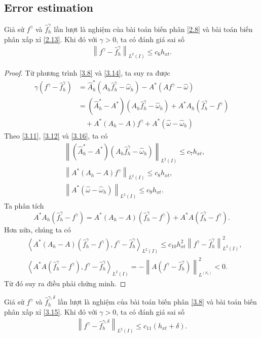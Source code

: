 \documentclass[]{article}
\begin{document}
\subsection{Error estimation}
\begin{dl}\label{dl3.3}
	Giả sử $f^\gamma$ và $\hat{f}^\gamma_h$ lần lượt là nghiệm của bài toán biến phân \eqref{2.8} và bài toán biến phân xấp xỉ \eqref{2.13}. Khi đó với $\gamma>0$, ta có đánh giá sai số
	\begin{align}\label{3.17}
	\left\|f^\gamma-\hat{f}^\gamma_h \right\|_{L^2(I)}\leq c_6h_{xt}.
	\end{align}
\end{dl}
\begin{proof} Từ phương trình \eqref{3.8} và \eqref{3.14}, ta suy ra được
	\begin{align*}
		\gamma \left(f^\gamma-\hat{f}^\gamma_h\right)&=\hat{A}^*_h\left(A_h\hat{f}^\gamma_h-\hat{\omega}_h\right)-A^*\left(Af^\gamma-\hat{\omega}\right)\\
		&=\left(\hat{A}^*_h-A^*\right)\left(A_h\hat{f}^\gamma_h-\hat{\omega}_h\right)+A^*A_h\left(\hat{f}^\gamma_h-f^\gamma\right)\\
		&\quad+A^*\left(A_h-A\right)f^\gamma+A^*\left(\hat{\omega}-\hat{\omega}_h\right)
	\end{align*}
	Theo \eqref{3.11}, \eqref{3.12} và \eqref{3.16}, ta có
	\begin{align*}
		&\left\| \left(\hat{A}^*_h-A^*\right)\left(A_h\hat{f}^\gamma_h-\hat{\omega}_h\right)\right\|_{L^2(I)}\leq c_7h_{xt},\\
		&\left\| A^*\left(A_h-A\right)f^\gamma\right\|_{L^2(I)}\leq c_8h_{xt},\\
		&\left\|A^*\left(\hat{\omega}-\hat{\omega}_h\right) \right\|_{L^2(I)}\leq c_9h_{xt}.
	\end{align*}
	Ta phân tích
	$$A^*A_h\left(\hat{f}^\gamma_h-f^\gamma\right)=A^*\left(A_h-A\right)\left(\hat{f}^\gamma_h-f^\gamma\right)+A^*A\left(\hat{f}^\gamma_h-f^\gamma\right).$$
	Hơn nữa, chúng ta có
	\begin{align*}
		&\left\langle A^*\left(A_h-A\right)\left(\hat{f}^\gamma_h-f^\gamma\right), f^\gamma-\hat{f}^\gamma_h\right\rangle_{L^2(I)}\leq c_{10}h_{xt}^2\left\| f^\gamma-\hat{f}^\gamma_h\right\|^2_{L^2(I)},\\
		&\left\langle A^*A\left(\hat{f}^\gamma_h-f^\gamma\right), f^\gamma-\hat{f}^\gamma_h\right\rangle_{L^2(I)}=-\left\|A\left(f^\gamma-\hat{f}^\gamma_h\right) \right\|^2_{L^(S_1)}<0.
	\end{align*}
	Từ đó suy ra điều phải chứng minh.
\end{proof}
\begin{cy}\label{cy3.1}
	Giả sử $f^\gamma$ và $\hat{f}^{\gamma, \delta}_h$ lần lượt là nghiệm của bài toán biến phân \eqref{3.8} và bài toán biến phân xấp xỉ \eqref{3.15}. Khi đó với $\gamma>0$, ta có đánh giá sai số
	\begin{align}\label{3.18}
	\left\|f^\gamma-\hat{f}^{\gamma, \delta}_h \right\|_{L^2(I)}\leq c_{11}(h_{xt}+\delta).
	\end{align}
\end{cy}
\end{document}
